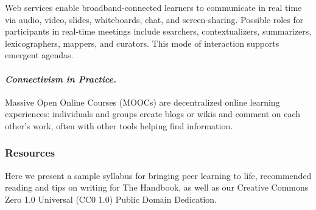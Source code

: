 Web services enable broadband-connected learners to communicate in real
time via audio, video, slides, whiteboards, chat, and screen-sharing.
Possible roles for participants in real-time meetings include searchers,
contextualizers, summarizers, lexicographers, mappers, and curators.
This mode of interaction supports emergent agendas.

\paragraph{\emph{Connectivism in
Practice.}}\label{connectivism-in-practice.}

Massive Open Online Courses (MOOCs) are decentralized online learning
experiences: individuals and groups create blogs or wikis and comment on
each other's work, often with other tools helping find information.

\subsubsection{Resources}\label{peeragogy-resources}

Here we present a sample syllabus for bringing peer learning to life,
recommended reading and tips on writing for The Handbook, as well as our
Creative Commons Zero 1.0 Universal (CC0 1.0) Public Domain Dedication.
